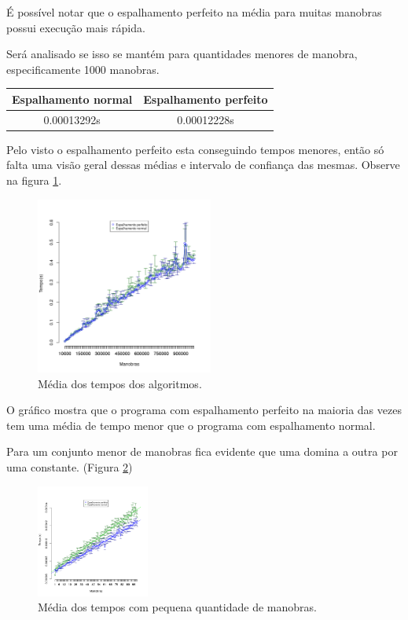 \documentclass[11pt]{article}
\begin{document}
É possível notar que o espalhamento perfeito na média para muitas manobras possui execução mais rápida.

Será analisado se isso se mantém para quantidades menores de manobra, especificamente 1000 manobras.

\begin{center}
\begin{tabular}{|c|c|}
\hline
Espalhamento normal & Espalhamento perfeito\\
\hline
0.00013292s & 0.00012228s\\
\hline
\end{tabular}

\end{center}

Pelo visto o espalhamento perfeito esta conseguindo tempos menores, então só falta uma visão geral dessas médias e intervalo de confiança das mesmas. Observe na figura \ref{fig:means-data}.

\begin{figure}[htbp]
\centering
\includegraphics[width=0.52\textwidth]{means-data.png}
\caption{Média dos tempos dos algoritmos.\label{fig:means-data}}
\end{figure}


O gráfico mostra que o programa com espalhamento perfeito na maioria das vezes tem uma média de tempo menor que o programa com espalhamento normal.

Para um conjunto menor de manobras fica evidente que uma domina a outra por uma constante. (Figura \ref{fig:means-obj-100-data})



\begin{figure}[htbp]
\centering
\includegraphics[width=0.33\textwidth]{means-obj-100-data.png}
\caption{Média dos tempos com pequena quantidade de manobras.\label{fig:means-obj-100-data}}
\end{figure}
\end{document}

